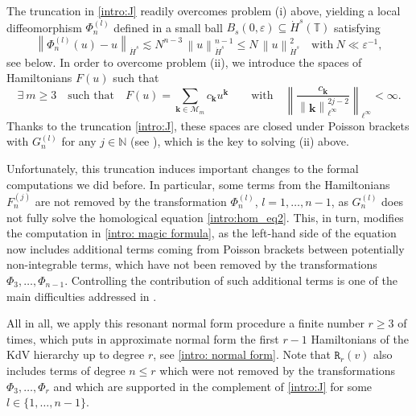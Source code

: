 \documentclass[a4paper,10pt,reqno]{article}
\theoremstyle{definition}
\theoremstyle{plain}
\theoremstyle{plain}
\theoremstyle{definition}
\theoremstyle{plain}
\theoremstyle{plain}
\theoremstyle{plain}
\theoremstyle{definition}
\theoremstyle{definition}
\newcommand{\norm}[1]{\left\lVert #1 \right\rVert}
\def \N{\mathbb N}
\def \T{\mathbb{T}}
\def \k{\bm{k}}
\begin{document}
The truncation in \eqref{intro:J} readily overcomes problem (i) above, yielding a local diffeomorphism $\Phi_n^{(l)}$ defined in a small ball $B_s(0,\varepsilon) \subseteq \dot{H}^s(\T)$ satisfying
\begin{equation} \label{intro: close to id}
    \norm{\Phi_n^{(l)} (u) - u}_{\dot{H}^s} \lesssim N^{n-3}\, \norm{u}_{\dot{H}^s}^{n-1}\leq N \,\norm{u}_{\dot{H}^s}^2\quad \mbox{with}\ N \ll \varepsilon^{-1},
\end{equation}
see  below. In order to overcome problem (ii), we introduce the spaces of Hamiltonians $F(u)$ such that
\begin{equation}\label{intro:space_coeff}
 \exists\ m \geq 3 \quad \mbox{such that}\quad F(u) = \sum_{\k\in\mathcal{M}_m} c_{\k} u^{\k} \qquad \mbox{with}\quad \norm{\frac{c_{\bm{k}}}{\norm{\k}_{\ell^{\infty}}^{2j-2}}}_{\ell^{\infty}} < \infty.
\end{equation}
Thanks to the truncation \eqref{intro:J}, these spaces are closed under Poisson brackets with $G_n^{(l)}$ for any $j\in\N$ (see ), which is the key to solving (ii) above.

\smallskip

Unfortunately, this truncation induces important changes to the formal computations we did before. In particular, some terms from the Hamiltonians $F_n^{(j)}$ are not removed by the transformation $\Phi_n^{(l)}$, $l=1,\ldots, n-1$, as $G_n^{(l)}$ does not fully solve the homological equation \eqref{intro:hom_eq2}. This, in turn, modifies the computation in \eqref{intro: magic formula}, as the left-hand side of the equation now includes additional terms coming from Poisson brackets between potentially non-integrable terms, which have not been removed by the transformations $\Phi_3,\ldots,\Phi_{n-1}$. Controlling the contribution of such additional terms is one of the main difficulties addressed in .

All in all, we apply this resonant normal form procedure a finite number $r \ge 3$ of times, which puts in approximate normal form the first $r-1$ Hamiltonians of the KdV hierarchy up to degree $r$, see \eqref{intro: normal form}. Note that $\mathtt{R}_r(v)$ also includes terms of degree $n \leq r$ which were not removed by the transformations $\Phi_3,\ldots,\Phi_{r}$ and which are supported in the complement of \eqref{intro:J} for some $l\in \{1,\ldots,n-1\}$.

\medskip
\end{document}
